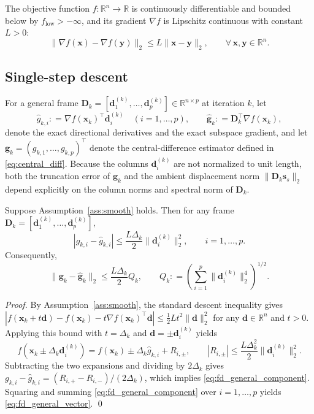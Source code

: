 \documentclass[smallextended]{svjour3}
\newcommand{\bx}{\bm{x}}
\newcommand{\bd}{\bm{d}}
\newcommand{\bg}{\bm{g}}
\newcommand{\bs}{\bm{s}}
\providecommand{\coloneqq}{\mathrel{\mathop:}=}
\begin{document}
\begin{assumption}
\label{ass:smooth}
The objective function $f:\mathbb R^n\to\mathbb R$ is continuously differentiable and bounded below by $f_{\mathrm{low}} > -\infty$, and its gradient $\nabla f$ is Lipschitz continuous with constant $L>0$:
\[
\|\nabla f(\bx)-\nabla f(\bm y)\|_2 \le L\|\bx-\bm y\|_2, \qquad \forall\, \bx,\bm y\in\mathbb R^n.
\]
\end{assumption}

\subsection{Single-step descent}
\label{subsec:estimation}

For a general frame $\bm D_k = [\bd_1^{(k)},\ldots,\bd_p^{(k)}] \in \mathbb{R}^{n \times p}$ at iteration $k$, let
\[
\hat g_{k,i} \coloneqq \nabla f(\bx_k)^\top\bd_i^{(k)} \quad (i = 1, \ldots, p), \qquad \hat{\bg}_k \coloneqq \bm D_k^\top\nabla f(\bx_k),
\]
denote the exact directional derivatives and the exact subspace gradient, and let $\bg_k = (g_{k,1},\ldots,g_{k,p})^\top$ denote the central-difference estimator defined in \eqref{eq:central_diff}. Because the columns $\bd_i^{(k)}$ are not normalized to unit length, both the truncation error of $\bg_k$ and the ambient displacement norm $\|\bm D_k \bs_s\|_2$ depend explicitly on the column norms and spectral norm of $\bm D_k$.

\begin{lemma}
\label{lem:fd_general}
\label{lem:fd}
Suppose Assumption~\ref{ass:smooth} holds. Then for any frame $\bm D_k = [\bd_1^{(k)},\ldots,\bd_p^{(k)}]$,
\begin{equation}
\label{eq:fd_general_component}
|g_{k,i}-\hat g_{k,i}| \le \frac{L\Delta_k}{2} \|\bd_i^{(k)}\|_2^2, \qquad i=1,\ldots,p.
\end{equation}
Consequently,
\begin{equation}
\label{eq:fd_general_vector}
\|\bg_k-\hat{\bg}_k\|_2 \le \frac{L\Delta_k}{2} Q_k, \qquad Q_k \coloneqq \left( \sum_{i=1}^p \|\bd_i^{(k)}\|_2^4 \right)^{1/2}.
\end{equation}
\end{lemma}

\begin{proof}
By Assumption~\ref{ass:smooth}, the standard descent inequality gives $|f(\bx_k + t\bd) - f(\bx_k) - t\nabla f(\bx_k)^\top \bd| \le \frac{1}{2}Lt^2\|\bd\|_2^2$ for any $\bd \in \mathbb{R}^n$ and $t > 0$. Applying this bound with $t=\Delta_k$ and $\bd = \pm \bd_i^{(k)}$ yields
\[
f(\bx_k \pm \Delta_k\bd_i^{(k)}) = f(\bx_k) \pm \Delta_k\hat g_{k,i} + R_{i,\pm}, \qquad |R_{i,\pm}| \le \frac{L\Delta_k^2}{2} \|\bd_i^{(k)}\|_2^2.
\]
Subtracting the two expansions and dividing by $2\Delta_k$ gives $g_{k,i}-\hat g_{k,i} = (R_{i,+}-R_{i,-})/(2\Delta_k)$, which implies \eqref{eq:fd_general_component}. Squaring and summing \eqref{eq:fd_general_component} over $i=1,\ldots,p$ yields \eqref{eq:fd_general_vector}.
\qed
\end{proof}
\end{document}
